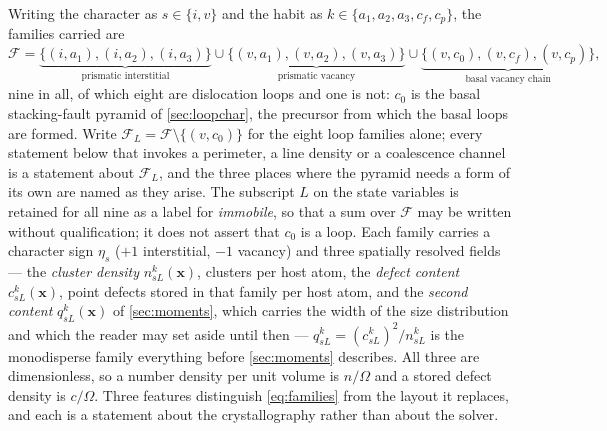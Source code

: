 \documentclass{article}
\begin{document}
Writing the character as $s\in\{i,v\}$ and the habit as
$k\in\{a_1,a_2,a_3,c_f,c_p\}$, the families carried are
\begin{equation}
  \mathcal F=
  \underbrace{\{(i,a_1),(i,a_2),(i,a_3)\}}_{\text{prismatic interstitial}}
  \cup
  \underbrace{\{(v,a_1),(v,a_2),(v,a_3)\}}_{\text{prismatic vacancy}}
  \cup
  \underbrace{\{(v,c_0),(v,c_f),(v,c_p)\}}_{\text{basal vacancy chain}},
  \label{eq:families}
\end{equation}
nine in all, of which eight are dislocation loops and one is not: $c_0$ is the
basal stacking-fault pyramid of \cref{sec:loopchar}, the precursor from which the
basal loops are formed. Write $\mathcal F_L=\mathcal F\setminus\{(v,c_0)\}$ for
the eight loop families alone; every statement below that invokes a perimeter, a
line density or a coalescence channel is a statement about $\mathcal F_L$, and
the three places where the pyramid needs a form of its own are named as they
arise. The subscript $L$ on the state variables is retained for all nine as a
label for \emph{immobile}, so that a sum over $\mathcal F$ may be written without
qualification; it does not assert that $c_0$ is a loop. Each family carries a character sign $\eta_s$ ($+1$ interstitial,
$-1$ vacancy) and three spatially resolved fields --- the \emph{cluster density}
$n^k_{sL}(\bm x)$, clusters per host atom, the \emph{defect content}
$c^k_{sL}(\bm x)$, point defects stored in that family per host atom, and the
\emph{second content} $q^k_{sL}(\bm x)$ of \cref{sec:moments}, which carries the
width of the size distribution and which the reader may set aside until then ---
$q^k_{sL}=(c^k_{sL})^2/n^k_{sL}$ is the monodisperse family everything before
\cref{sec:moments} describes. All three are
dimensionless, so a number density per unit volume is $n/\Omega$ and a stored
defect density is $c/\Omega$. Three features distinguish \cref{eq:families} from
the layout it replaces, and each is a statement about the crystallography rather
than about the solver.
\end{document}
